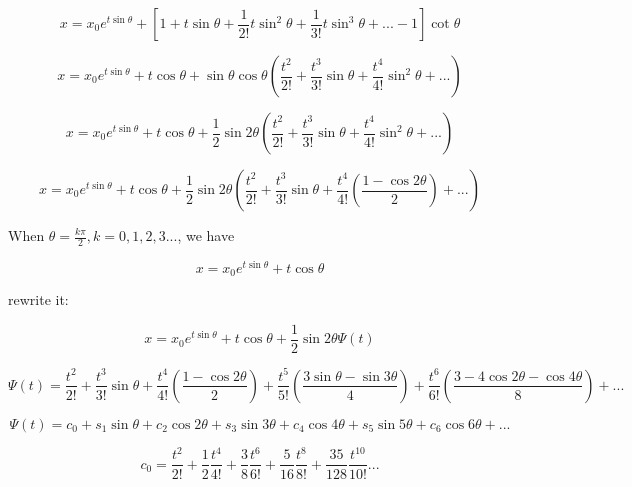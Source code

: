 \documentclass{article}
\begin{document}
\begin{equation}
   x =  x_0 e^{t \sin \theta} + [1 + t \sin \theta + \frac{1}{2!} t\sin^2 \theta  + \frac{1}{3!} t \sin^3 \theta + ... - 1] \cot \theta
\end{equation}

\begin{equation}
   x =  x_0 e^{t \sin \theta} + t \cos \theta + \sin \theta \cos \theta (\frac{t^2}{2!} + \frac{t^3}{3!} \sin \theta + \frac{t^4}{4!} \sin^2 \theta + ...)
\end{equation}

\begin{equation}
   x =  x_0 e^{t \sin \theta} + t \cos \theta + \frac{1}{2} \sin 2\theta (\frac{t^2}{2!} + \frac{t^3}{3!} \sin \theta + \frac{t^4}{4!} \sin^2 \theta + ...)
\end{equation}

\begin{equation}
   x =  x_0 e^{t \sin \theta} + t \cos \theta + \frac{1}{2} \sin 2\theta (\frac{t^2}{2!} + \frac{t^3}{3!} \sin \theta + \frac{t^4}{4!} (\frac{1 - \cos 2\theta}{2}) + ...)
\end{equation}

When $\theta = \frac{k \pi}{2}, k = 0, 1, 2, 3...$, we have

\begin{equation}
    x = x_0 e^{t \sin \theta} + t \cos \theta
\end{equation}

rewrite it:

\begin{equation}
   x =  x_0 e^{t \sin \theta} + t \cos \theta + \frac{1}{2} \sin 2\theta \Psi(t)
\end{equation}

\begin{equation}
   \Psi(t) =  \frac{t^2}{2!} + \frac{t^3}{3!} \sin \theta + \frac{t^4}{4!} (\frac{1 - \cos 2\theta}{2}) + \frac{t^5}{5!} (\frac{3 \sin \theta - \sin 3\theta}{4}) + \frac{t^6}{6!} (\frac{3 - 4 \cos 2\theta - \cos 4\theta}{8}) + ...
\end{equation}

\begin{equation}
   \Psi(t) = c_0 + s_1 \sin \theta + c_2 \cos 2\theta + s_3 \sin 3\theta + c_4 \cos 4\theta + s_5 \sin 5\theta + c_6 \cos 6\theta + ...
\end{equation}

\begin{equation}
   c_0 = \frac{t^2}{2!} + \frac{1}{2}\frac{t^4}{4!} + \frac{3}{8} \frac{t^6}{6!} + \frac{5}{16} \frac{t^8}{8!} + \frac{35}{128} \frac{t^{10}}{10!}  ...
\end{equation}
\end{document}

